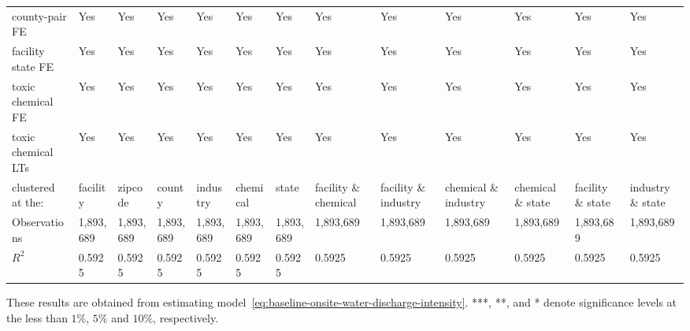 \begin{table}[H]
{\begin{tabular}{@{}lllllllllllll@{}}
            county-pair FE                                & Yes       & Yes       & Yes       & Yes       & Yes       & Yes       & Yes                  & Yes                  & Yes                  & Yes               & Yes               & Yes               \\
            facility state FE                             & Yes       & Yes       & Yes       & Yes       & Yes       & Yes       & Yes                  & Yes                  & Yes                  & Yes               & Yes               & Yes               \\
            toxic chemical FE                             & Yes       & Yes       & Yes       & Yes       & Yes       & Yes       & Yes                  & Yes                  & Yes                  & Yes               & Yes               & Yes               \\
            toxic chemical LTs                            & Yes       & Yes       & Yes       & Yes       & Yes       & Yes       & Yes                  & Yes                  & Yes                  & Yes               & Yes               & Yes               \\ \midrule \midrule
            clustered at the:                             & facility  & zipcode   & county    & industry  & chemical  & state     & facility \& chemical & facility \& industry & chemical \& industry & chemical \& state & facility \& state & industry \& state \\
            Observations                                  & 1,893,689 & 1,893,689 & 1,893,689 & 1,893,689 & 1,893,689 & 1,893,689 & 1,893,689            & 1,893,689            & 1,893,689            & 1,893,689         & 1,893,689         & 1,893,689         \\
            $R^2$                                         & 0.5925    & 0.5925    & 0.5925    & 0.5925    & 0.5925    & 0.5925    & 0.5925               & 0.5925               & 0.5925               & 0.5925            & 0.5925            & 0.5925            \\ \bottomrule \bottomrule
        \end{tabular}%
    }
    \begin{minipage}{18cm}
        \vspace{0.05in}
        These results are obtained from estimating model~\ref{eq:baseline-onsite-water-discharge-intensity}. ***, **, and * denote significance levels at the less than $1\%$, $5\%$ and $10\%$, respectively.
    \end{minipage}
\end{table}